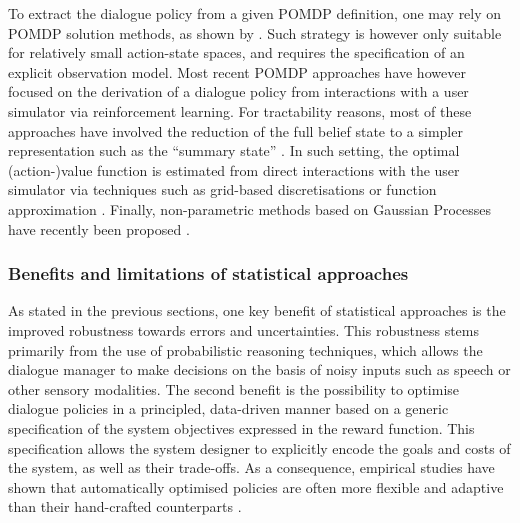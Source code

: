To extract the dialogue policy from a given POMDP definition, one may rely on POMDP solution methods, as shown by \cite{Williams:2007,Williamsetal:2008}.  Such strategy is however only suitable for relatively small action-state spaces, and requires the specification of an explicit observation model.  Most recent POMDP approaches have however focused on the derivation of a dialogue policy from interactions with a user simulator via reinforcement learning.  For tractability reasons, most of these approaches have involved the reduction of the full belief state to a simpler representation such as the ``summary state'' \citep{williams2005}.  In such setting, the optimal (action-)value function is estimated  from direct interactions with the user simulator via techniques such as grid-based discretisations \citep{Young:2010} or function approximation  \citep{Thomson:2010:BUD:1772996.1773040, daubigney2012}.  Finally, non-parametric methods based on Gaussian Processes have recently been proposed \citep{gasic2011}. 

\subsubsection*{Benefits and limitations of statistical approaches}


As stated in the previous sections, one key benefit of statistical approaches is the improved robustness towards errors and uncertainties. This robustness stems primarily from the use of probabilistic reasoning techniques, which allows the dialogue manager to make decisions on the basis of noisy inputs such as speech or other sensory modalities.  The second benefit is the possibility to optimise dialogue policies in a principled, data-driven manner based on a generic specification of the system objectives expressed in the reward function.  This specification allows the system designer to explicitly encode the goals and costs of the system, as well as their trade-offs. As a consequence, empirical studies have shown that automatically optimised policies are often more flexible and adaptive than their hand-crafted counterparts \citep{Supelec270,6407655}.  


